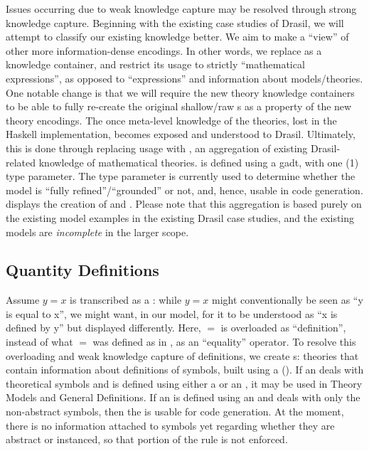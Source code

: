 Issues occurring due to weak knowledge capture may be resolved through strong
knowledge capture. Beginning with the existing case studies of Drasil, we will
attempt to classify our existing knowledge better. We aim to make
\RelationConcept{} a ``view'' of other more information-dense encodings. In
other words, we replace \Expr{} as a knowledge container, and restrict its usage
to strictly ``mathematical expressions'', as opposed to ``expressions'' and
information about models/theories. One notable change is that we will require
the new theory knowledge containers to be able to fully re-create the original
shallow/raw \Expr{}s as a property of the new theory encodings. The once
meta-level knowledge of the theories, lost in the Haskell implementation,
becomes exposed and understood to Drasil. Ultimately, this is done through
replacing \RelationConcept{} usage with \ModelKind{}, an aggregation of existing
Drasil-related knowledge of mathematical theories. \ModelKind{} is defined using
a \acs{gadt}, with one (1) type parameter. The type parameter is currently used
to determine whether the model is ``fully refined''/``grounded'' or not, and,
hence, usable in code generation.  displays the
creation of \ModelKind{} and \ModelKinds{}. Please note that this aggregation is
based purely on the existing model examples in the existing Drasil case studies,
and the existing models are \textit{incomplete} in the larger scope.


\currentModelKindsHaskell{}

\subsection{Quantity Definitions}

\currentQDefinitionHaskell{}

Assume \(y = x\) is transcribed as a \RelationConcept{}: while \(y = x\) might
conventionally be seen as ``y is equal to x'', we might want, in our model, for
it to be understood as ``x is defined by y'' but displayed differently. Here,
\(=\) is overloaded as ``definition'', instead of what \(=\) was defined as in
\Expr{}, as an ``equality'' operator. To resolve this overloading and weak
knowledge capture of definitions, we create \EquationalModel{}s: theories that
contain information about definitions of symbols, built using a
\QDefinition{} (). If an \EquationalModel{}
deals with theoretical symbols and is defined using either a \ModelExpr{} or an
\Expr{}, it may be used in Theory Models and General Definitions. If an
\EquationalModel{} is defined using an \Expr{} and deals with only the
non-abstract symbols, then the
\EquationalModel{} is usable for code generation. At the moment, there is no
information attached to symbols yet regarding whether they are abstract or
instanced, so that portion of the rule is not enforced.

